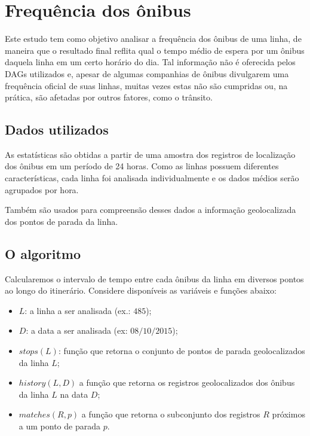 \renewcommand{\labelenumii}{\theenumii}
\renewcommand{\theenumii}{\theenumi.\arabic{enumii}.}

\section{Frequência dos ônibus}

Este estudo tem como objetivo analisar a frequência dos ônibus de uma linha, de maneira que o resultado final reflita qual o tempo médio de espera por um ônibus daquela linha em um certo horário do dia. Tal informação não é oferecida pelos DAGs utilizados e, apesar de algumas companhias de ônibus divulgarem uma frequência oficial de suas linhas, muitas vezes estas não são cumpridas ou, na prática, são afetadas por outros fatores, como o trânsito.


\subsection{Dados utilizados}

As estatísticas são obtidas a partir de uma amostra dos registros de localização dos ônibus em um período de 24 horas. Como as linhas possuem diferentes características, cada linha foi analisada individualmente e os dados médios serão agrupados por hora.

Também são usados para compreensão desses dados a informação geolocalizada dos pontos de parada da linha.


\subsection{O algoritmo}

Calcularemos o intervalo de tempo entre cada ônibus da linha em diversos pontos ao longo do itinerário. Considere disponíveis as variáveis e funções abaixo:

\begin{itemize}
    \item $L$: a linha a ser analisada (ex.: $485$);
    \item $D$: a data a ser analisada (ex: $08/10/2015$);
    \item $stops(L)$: função que retorna o conjunto de pontos de parada geolocalizados da linha $L$;
    \item $history(L,D)$ a função que retorna os registros geolocalizados dos ônibus da linha $L$ na data $D$;
    \item $matches(R,p)$ a função que retorna o subconjunto dos registros $R$ próximos a um ponto de parada $p$.
\end{itemize}

